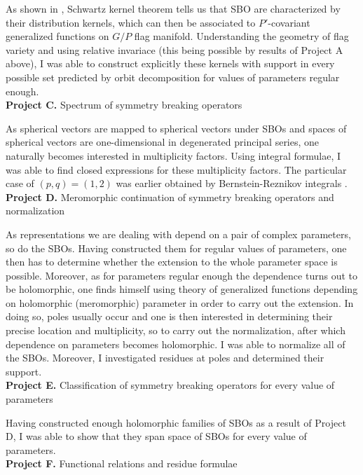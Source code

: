 \documentclass[11pt,a4paper,twoside]{jarticle}
\newcommand{\研究課題名}{Symmetry breaking operators}
\newcommand{\研究機関名}{東京大学}
\newcommand{\申請者氏名}{レオンチエフ\,オレクシィ}
\newcommand{\研究代表者氏名}{\申請者氏名}
\newcommand{\研究期間の最終元号年度}{31}	%
\begin{document}
{	As shown in \cite{KS15},
	Schwartz kernel theorem tells us that SBO are characterized by their distribution kernels,
	which can then be associated to $P'$-covariant generalized functions on $G/P$ flag manifold.
	Understanding the geometry of flag variety and using relative invariace (this being possible by results of Project A above),
	I was able to construct explicitly these kernels with support in every possible set predicted by orbit decomposition for values of parameters regular enough.\\
	\textbf{Project C.} Spectrum of symmetry breaking operators

	As spherical vectors are mapped to spherical vectors under SBOs and spaces of spherical vectors are one-dimensional in degenerated principal series,
	one naturally becomes interested in multiplicity factors. Using integral formulae,
	I was able to find closed expressions for these multiplicity factors. The particular case of $(p,q)=(1,2)$ was earlier obtained by Bernstein-Reznikov integrals \cite{CKOP11}.\\
	\textbf{Project D.} Meromorphic continuation of symmetry breaking operators and normalization

	As representations we are dealing with depend on a pair of complex parameters, so do the SBOs. Having constructed them for regular values of parameters,
	one then has to determine whether the extension to the whole parameter space is possible. Moreover, as for parameters regular enough the dependence turns out to be holomorphic,
	one finds himself using theory of generalized functions depending on holomorphic (meromorphic) parameter in order to carry out the extension. In doing so, poles usually occur and one is 
	then interested in determining their precise location and multiplicity, so to carry out the normalization, after which dependence on parameters becomes holomorphic. 
	I was able to normalize all of the SBOs. Moreover, I investigated residues at poles and determined their support.\\
	\textbf{Project E.} Classification of symmetry breaking operators for every value of parameters

	Having constructed enough holomorphic families of SBOs as a result of Project D, I was able to show that they span space of SBOs for every value of parameters. \\
	\textbf{Project F.} Functional relations and residue formulae

}
\end{document}

